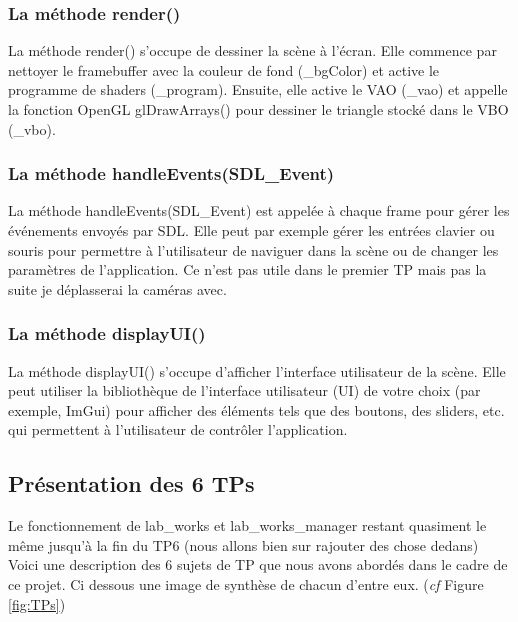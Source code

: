 \documentclass[10pt,a4paper]{article}
\begin{document}
		\subsubsection{La méthode render()} %
			La méthode render() s'occupe de dessiner la scène à l'écran. Elle commence par nettoyer le framebuffer avec la couleur de fond (\_bgColor) et active le programme de shaders (\_program). Ensuite, elle active le VAO (\_vao) et appelle la fonction OpenGL glDrawArrays() pour dessiner le triangle stocké dans le VBO (\_vbo).

		\subsubsection{La méthode handleEvents(SDL\_Event)} %
			La méthode handleEvents(SDL\_Event) est appelée à chaque frame pour gérer les événements envoyés par SDL. Elle peut par exemple gérer les entrées clavier ou souris pour permettre à l'utilisateur de naviguer dans la scène ou de changer les paramètres de l'application. Ce n'est pas utile dans le premier TP mais pas la suite je déplasserai la caméras avec. 

		\subsubsection{La méthode displayUI()} %
		La méthode displayUI() s'occupe d'afficher l'interface utilisateur de la scène. Elle peut utiliser la bibliothèque de l'interface utilisateur (UI) de votre choix (par exemple, ImGui) pour afficher des éléments tels que des boutons, des sliders, etc. qui permettent à l'utilisateur de contrôler l'application.


	\subsection{Présentation des 6 TPs} %
		Le fonctionnement de lab\_works et lab\_works\_manager restant quasiment le même jusqu'à la fin du TP6 (nous allons bien sur rajouter des chose dedans) Voici une description des 6 sujets de TP que nous avons abordés dans le cadre de ce projet. Ci dessous une image de synthèse de chacun d'entre eux. (\textit{cf} Figure \ref{fig:TPs})
\end{document}
